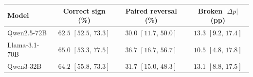 \begin{tabular}{@{}lccc@{}}
\toprule
Model & Correct sign (\%) & Paired reversal (\%) & Broken $|\Delta p|$ (pp) \\
\midrule
Qwen2.5-72B & $62.5$ $[52.5,\,73.3]$ & $30.0$ $[11.7,\,50.0]$ & $13.3$ $[9.2,\,17.4]$ \\
Llama-3.1-70B & $65.0$ $[53.3,\,77.5]$ & $36.7$ $[16.7,\,56.7]$ & $10.5$ $[4.8,\,17.8]$ \\
Qwen3-32B & $64.2$ $[55.8,\,73.3]$ & $31.7$ $[15.0,\,48.3]$ & $13.1$ $[8.8,\,17.5]$ \\
\bottomrule
\end{tabular}
